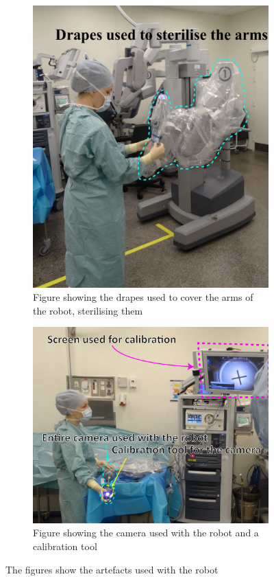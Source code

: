 \documentclass[paper=a4, fontsize=11pt]{scrartcl} %
\numberwithin{equation}{section} %
\numberwithin{figure}{section} %
\numberwithin{table}{section} %
\begin{document}
\begin{figure}[hbpt]
	\centering
	\begin{subfigure}[b]{0.6\textwidth}
		\includegraphics[width=\textwidth]{drapes}
		\caption{Figure showing the drapes used to cover the arms of the robot, sterilising them}
		\label{fig:drapes}
	\end{subfigure}

	\begin{subfigure}[b]{0.6\textwidth}
		\includegraphics[width=\textwidth]{camera}
		\caption{Figure showing the camera used with the robot and a calibration tool}
		\label{fig:camera}
	\end{subfigure}
	\caption{The figures show the artefacts used with the robot}
	\label{fig:artefacts}
\end{figure}
\end{document}
